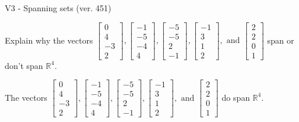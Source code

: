\begin{exercise}
  \begin{exerciseTitle}V3 - Spanning sets (ver. 451)\end{exerciseTitle}
  \begin{exerciseStatement}
    Explain why the vectors \(\left[\begin{array}{r}
0 \\
4 \\
-3 \\
2
\end{array}\right] , \left[\begin{array}{r}
-1 \\
-5 \\
-4 \\
4
\end{array}\right] , \left[\begin{array}{r}
-5 \\
-5 \\
2 \\
-1
\end{array}\right] , \left[\begin{array}{r}
-1 \\
3 \\
1 \\
2
\end{array}\right] , \text{ and } \left[\begin{array}{r}
2 \\
2 \\
0 \\
1
\end{array}\right]\) span or don't span \(\mathbb{R}^4\). 
	


  \end{exerciseStatement}
  \begin{exerciseAnswer}
   The vectors \(\left[\begin{array}{r}
0 \\
4 \\
-3 \\
2
\end{array}\right] , \left[\begin{array}{r}
-1 \\
-5 \\
-4 \\
4
\end{array}\right] , \left[\begin{array}{r}
-5 \\
-5 \\
2 \\
-1
\end{array}\right] , \left[\begin{array}{r}
-1 \\
3 \\
1 \\
2
\end{array}\right] , \text{ and } \left[\begin{array}{r}
2 \\
2 \\
0 \\
1
\end{array}\right]\) 
  	 do  
	span \(\mathbb{R}^4\).
  



\end{exerciseAnswer}
\end{exercise}
